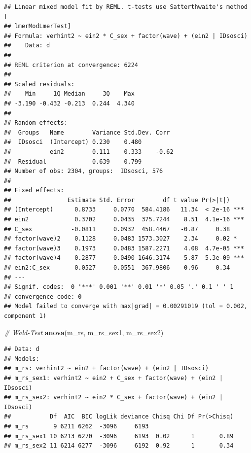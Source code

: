 \documentclass[
]{book}
\newenvironment{Shaded}{\begin{snugshade}}{\end{snugshade}}
\newcommand{\CommentTok}[1]{\textcolor[rgb]{0.56,0.35,0.01}{\textit{#1}}}
\newcommand{\DecValTok}[1]{\textcolor[rgb]{0.00,0.00,0.81}{#1}}
\newcommand{\KeywordTok}[1]{\textcolor[rgb]{0.13,0.29,0.53}{\textbf{#1}}}
\newcommand{\NormalTok}[1]{#1}
\newcommand{\OperatorTok}[1]{\textcolor[rgb]{0.81,0.36,0.00}{\textbf{#1}}}
\newcommand{\StringTok}[1]{\textcolor[rgb]{0.31,0.60,0.02}{#1}}
\begin{document}
\begin{verbatim}
## Linear mixed model fit by REML. t-tests use Satterthwaite's method [
## lmerModLmerTest]
## Formula: verhint2 ~ ein2 * C_sex + factor(wave) + (ein2 | IDsosci)
##    Data: d
## 
## REML criterion at convergence: 6224
## 
## Scaled residuals: 
##    Min     1Q Median     3Q    Max 
## -3.190 -0.432 -0.213  0.244  4.340 
## 
## Random effects:
##  Groups   Name        Variance Std.Dev. Corr 
##  IDsosci  (Intercept) 0.230    0.480         
##           ein2        0.111    0.333    -0.62
##  Residual             0.639    0.799         
## Number of obs: 2304, groups:  IDsosci, 576
## 
## Fixed effects:
##                Estimate Std. Error        df t value Pr(>|t|)    
## (Intercept)      0.8733     0.0770  584.4186   11.34  < 2e-16 ***
## ein2             0.3702     0.0435  375.7244    8.51  4.1e-16 ***
## C_sex           -0.0811     0.0932  458.4467   -0.87     0.38    
## factor(wave)2    0.1128     0.0483 1573.3027    2.34     0.02 *  
## factor(wave)3    0.1973     0.0483 1587.2271    4.08  4.7e-05 ***
## factor(wave)4    0.2877     0.0490 1646.3174    5.87  5.3e-09 ***
## ein2:C_sex       0.0527     0.0551  367.9806    0.96     0.34    
## ---
## Signif. codes:  0 '***' 0.001 '**' 0.01 '*' 0.05 '.' 0.1 ' ' 1
## convergence code: 0
## Model failed to converge with max|grad| = 0.00291019 (tol = 0.002, component 1)
\end{verbatim}

\begin{Shaded}
\begin{Highlighting}[]
\CommentTok{# Wald-Test}
\KeywordTok{anova}\NormalTok{(m_rs, m_rs_sex1, m_rs_sex2)}
\end{Highlighting}
\end{Shaded}

\begin{verbatim}
## Data: d
## Models:
## m_rs: verhint2 ~ ein2 + factor(wave) + (ein2 | IDsosci)
## m_rs_sex1: verhint2 ~ ein2 + C_sex + factor(wave) + (ein2 | IDsosci)
## m_rs_sex2: verhint2 ~ ein2 * C_sex + factor(wave) + (ein2 | IDsosci)
##           Df  AIC  BIC logLik deviance Chisq Chi Df Pr(>Chisq)
## m_rs       9 6211 6262  -3096     6193                        
## m_rs_sex1 10 6213 6270  -3096     6193  0.02      1       0.89
## m_rs_sex2 11 6214 6277  -3096     6192  0.92      1       0.34
\end{verbatim}

\begin{Shaded}
\end{Shaded}
\end{document}
